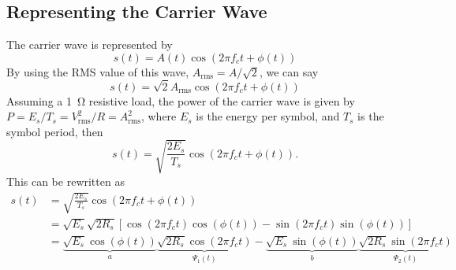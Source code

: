 \documentclass{article}
\begin{document}
\subsection{Representing the Carrier Wave}
The carrier wave is represented by
\begin{equation*}
    s\left( t \right) = A\left( t \right) \cos{\left( 2 \pi f_c t + \phi\left( t \right) \right)}
\end{equation*}
By using the RMS value of this wave, \(A_{\mathrm{rms}} = A / \sqrt{2}\),
we can say
\begin{equation*}
    s\left( t \right) = \sqrt{2} A_{\mathrm{rms}} \cos{\left( 2 \pi f_c t + \phi\left( t \right) \right)}
\end{equation*}
Assuming a \qty{1}{\ohm} resistive load, the power of the carrier wave
is given by \(P = E_s / T_s = V_{\mathrm{rms}}^2 / R = A_{\mathrm{rms}}^2\),
where \(E_s\) is the energy per symbol, and \(T_s\) is the symbol period,
then
\begin{equation*}
    s\left( t \right) = \sqrt{\frac{2E_s}{T_s}} \cos{\left( 2 \pi f_c t + \phi\left( t \right) \right)}.
\end{equation*}
This can be rewritten as
\begin{align*}
    s\left( t \right) & = \sqrt{\frac{2E_s}{T_s}} \cos{\left( 2 \pi f_c t + \phi\left( t \right) \right)}                                                                                                                                                                                                                                       \\
                      & = \sqrt{E_s} \sqrt{2 R_s} \left[ \cos{\left( 2 \pi f_c t \right)} \cos{\left( \phi\left( t \right) \right)} - \sin{\left( 2 \pi f_c t \right)} \sin{\left( \phi\left( t \right) \right)} \right]                                                                                                                        \\
                      & = \underbrace{\sqrt{E_s} \cos{\left( \phi\left( t \right) \right)}}_{a} \underbrace{\sqrt{2 R_s} \cos{\left( 2 \pi f_c t \right)}}_{\Psi_1\left( t \right)} - \underbrace{\sqrt{E_s} \sin{\left( \phi\left( t \right) \right)}}_{b} \underbrace{\sqrt{2 R_s} \sin{\left( 2 \pi f_c t \right)}}_{\Psi_2\left( t \right)}
\end{align*}
\end{document}
